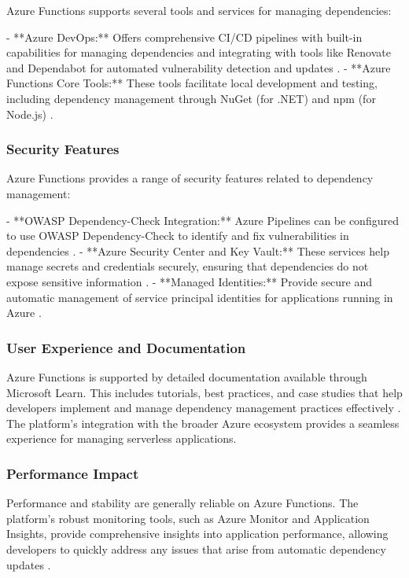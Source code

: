 \documentclass[12pt, letterpaper]{article}
\begin{document}
Azure Functions supports several tools and services for managing dependencies:

- **Azure DevOps:** Offers comprehensive CI/CD pipelines with built-in capabilities for managing dependencies and integrating with tools like Renovate and Dependabot for automated vulnerability detection and updates \cite{azureDevOps2023}.
- **Azure Functions Core Tools:** These tools facilitate local development and testing, including dependency management through NuGet (for .NET) and npm (for Node.js) \cite{azureCoreTools2023}.

\subsubsection{Security Features}

Azure Functions provides a range of security features related to dependency management:

- **OWASP Dependency-Check Integration:** Azure Pipelines can be configured to use OWASP Dependency-Check to identify and fix vulnerabilities in dependencies \cite{azureowasp2023}.
- **Azure Security Center and Key Vault:** These services help manage secrets and credentials securely, ensuring that dependencies do not expose sensitive information \cite{azureSecurity2023}.
- **Managed Identities:** Provide secure and automatic management of service principal identities for applications running in Azure \cite{azureManagedIdentities2023}.

\subsubsection{User Experience and Documentation}

Azure Functions is supported by detailed documentation available through Microsoft Learn. This includes tutorials, best practices, and case studies that help developers implement and manage dependency management practices effectively \cite{azureLearn2023}. The platform's integration with the broader Azure ecosystem provides a seamless experience for managing serverless applications.

\subsubsection{Performance Impact}

Performance and stability are generally reliable on Azure Functions. The platform's robust monitoring tools, such as Azure Monitor and Application Insights, provide comprehensive insights into application performance, allowing developers to quickly address any issues that arise from automatic dependency updates \cite{azurePerformance2023}.
\end{document}
